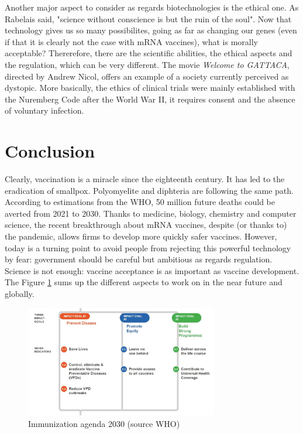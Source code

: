 \documentclass{article}
\begin{document}
        Another major aspect to consider as regards biotechnologies is the ethical one.
        As Rabelais said, "science without conscience is but the ruin of the soul".
        Now that technology gives us so many possibilites, 
        going as far as changing our genes (even if that it is clearly not the case with mRNA vaccines), what is morally acceptable? 
        Thererefore, there are the scientific abilities, the ethical aspects and the regulation, which can be very different.
        The movie \emph{Welcome to GATTACA}, directed by Andrew Nicol, offers an example of a society currently perceived as dystopic.
        More basically, the ethics of clinical trials were mainly established with the Nuremberg Code after the World War II,
            it requires consent and the absence of voluntary infection.
        
    \section{Conclusion}

        Clearly, vaccination is a miracle since the eighteenth century.
        It has led to the eradication of smallpox. Polyomyelite and diphteria are following the same path.
        According to estimations from the WHO, 50 million future deaths could be averted from 2021 to 2030.
        Thanks to medicine, biology, chemistry and computer science, 
            the recent breakthrough about mRNA vaccines, despite (or thanks to) the pandemic, allows firms to develop more quickly safer vaccines.
        However, today is a turning point to avoid people from rejecting this powerful technology by fear: government should be careful but ambitious
            as regards regulation. 
            Science is not enough: vaccine acceptance is as important as vaccine development.
            The Figure \ref{fig:agenda2} sums up the different aspects to work on in the near future and globally.

        \begin{figure}
            \centering
            \includegraphics[width=0.75\textwidth]{imgs/Objectives.JPG}
            \caption{Immunization agenda 2030 (source WHO)}
            \label{fig:agenda2}
        \end{figure}  
\end{document}
